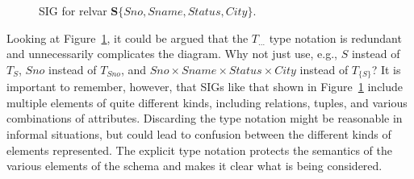 \documentclass{sig-alternate-05-2015}
\newcommand{\ProjectionAnnotation}[3][]{%
    \path (#2) to node[above,#1] {\scriptsize\(\RelProject\)} (#3);%
}
\newcommand{\Sno}{\ensuremath{\mathit{Sno}}}
\newcommand{\Sname}{\ensuremath{\mathit{Sname}}}
\newcommand{\Status}{\ensuremath{\mathit{Status}}}
\newcommand{\City}{\ensuremath{\mathit{City}}}
\newcommand{\T}[1]{\ensuremath{T_{#1}}}
\newcommand{\TT}[1]{\ensuremath{T_{\{#1\}}}}
\newcommand{\TSSC}{\ensuremath{\T{\Sname} \times \T{\Status} \times \T{\City}}}
\begin{document}
\begin{figure}[htb]
    \centering
    \caption{SIG for relvar \(\bm{S\{\Sno, \Sname, \Status, \City\}}\).}
    \label{fig-sig-s-alone}
\end{figure}


Looking at Figure~\ref{fig-sig-s-alone}, it could be argued that the \(T_{\dots}\) type notation is redundant and unnecessarily complicates the diagram. Why not just use, e.g., \(S\!\) instead of \(\T{S}\), \(\Sno\) instead of \(\T{\Sno}\), and \(\Sno \times \Sname \times \Status \times \City\) instead of \(\TT{S}\)? It is important to remember, however, that SIGs like that shown in Figure~\ref{fig-sig-s-alone} include multiple elements of quite different kinds, including relations, tuples, and various combinations of attributes. Discarding the type notation might be reasonable in informal situations, but could lead to confusion between the different kinds of elements represented. The explicit type notation protects the semantics of the various elements of the schema and makes it clear what is being considered.
\end{document}
